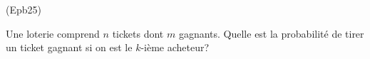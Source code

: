 \begin{tiny}(Epb25)\end{tiny} Une loterie comprend $n$ tickets dont $m$ gagnants. Quelle est la probabilité de tirer un ticket gagnant si on est le $k$-ième acheteur?
